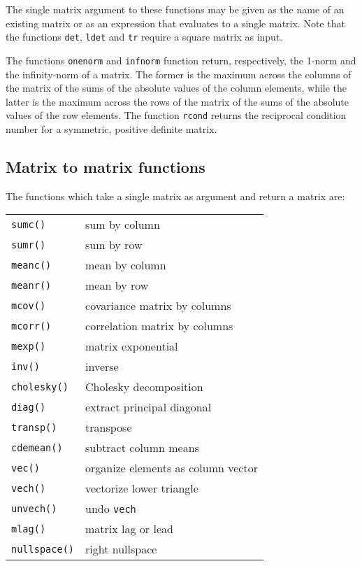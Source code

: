The single matrix argument to these functions may be given as the name
of an existing matrix or as an expression that evaluates to a single
matrix.  Note that the functions \texttt{det}, \texttt{ldet} and
\texttt{tr} require a square matrix as input.  

The functions \texttt{onenorm} and \texttt{infnorm} function return,
respectively, the 1-norm and the infinity-norm of a matrix.  The
former is the maximum across the columns of the matrix of the sums of
the absolute values of the column elements, while the latter is the
maximum across the rows of the matrix of the sums of the absolute
values of the row elements.  The function \texttt{rcond} returns the
reciprocal condition number for a symmetric, positive definite matrix.

\subsection{Matrix to matrix functions}
\label{matrix-to-matrix}

The functions which take a single matrix as argument and return a
matrix are:

\begin{center}
\begin{tabular}{ll}
\texttt{sumc()} & sum by column \\
\texttt{sumr()} & sum by row \\
\texttt{meanc()} & mean by column \\
\texttt{meanr()} & mean by row \\
\texttt{mcov()} & covariance matrix by columns \\
\texttt{mcorr()} & correlation matrix by columns \\
\texttt{mexp()} & matrix exponential \\
\texttt{inv()} & inverse \\
\texttt{cholesky()} & Cholesky decomposition \\
\texttt{diag()} & extract principal diagonal \\
\texttt{transp()} & transpose \\
\texttt{cdemean()} & subtract column means \\ 
\texttt{vec()} & organize elements as column vector \\
\texttt{vech()} & vectorize lower triangle \\
\texttt{unvech()} & undo \texttt{vech} \\
\texttt{mlag()} & matrix lag or lead \\
\texttt{nullspace()} & right nullspace
\end{tabular}
\end{center}

